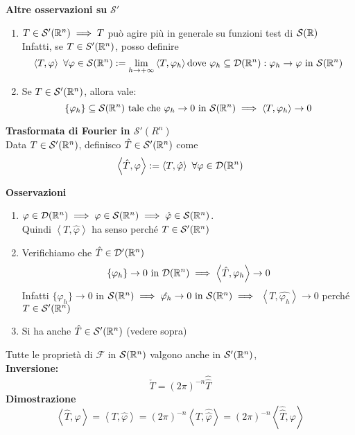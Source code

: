 \textbf{Altre osservazioni su }$\mathcal S'$ 
\begin{enumerate}
	\item $T\in \mathcal S'(\mathbb{R}^n)\implies T$ può agire più in generale su funzioni test di $\mathcal S(\mathbb{R})$
		\\Infatti, se $T\in S'(\mathbb{R}^n)$, posso definire 
		\[\left< T,\varphi \right> \ \forall \varphi \in \mathcal S(\R^n):=\lim_{h \to +\infty} \left< T,\varphi_h \right> \text{dove }\varphi_h \subseteq  \mathcal D(\R^n):\varphi_h\to \varphi\text{ in }\mathcal S(\R^n)\]
	\item Se $T\in \mathcal S '(\mathbb{R}^n)$, allora vale:
		\[\{\varphi_h\} \subseteq  \mathcal S(\mathbb{R}^n)\text{ tale che }\varphi_h\to 0\text{ in }\mathcal S( \mathbb{R}^n)\implies \left< T,\varphi_h \right> \to 0\]

\end{enumerate}
\begin{tcolorbox}
	\textbf{Trasformata di Fourier in $\mathcal S'(R^n)$}
	\\Data $T \in \mathcal S'(\mathbb{R}^n)$, definisco $\hat{T}\in \mathcal S'(\mathbb{R}^n)$ come
	\[\left< \hat{T}, \varphi \right> :=\left< T,\hat{\varphi} \right> \ \forall \varphi \in  \mathcal D(\mathbb{R}^n)\]

\end{tcolorbox}
\textbf{Osservazioni} 
\begin{enumerate}
	\item $\varphi \in \mathcal D(\mathbb{R}^n)\implies \varphi \in \mathcal S(\mathbb{R}^n)\implies \hat{\varphi}\in \mathcal S(\mathbb{R}^n)$. \\Quindi $\left< T, \hat{\varphi} \right> $ ha senso perché $T\in \mathcal S'(\mathbb{R}^n)$ 
	\item Verifichiamo che $\hat{T} \in \mathcal D'(\mathbb{R}^n)$ 
	\[\{\varphi_h\}\to 0\text{ in }\mathcal D(\mathbb{R}^n)\implies \left< \hat{T}, \varphi_h \right> \to 0 \]
		Infatti $\{\varphi_h\} \to 0$ in $\mathcal S(\mathbb{R}^n)\implies \hat{\varphi_h}\to 0\text{ in }\mathcal S(\mathbb{R}^n)\implies $ $\left< T,\hat{\varphi_h} \right> \to 0$ perché $T\in \mathcal S'(\mathbb{R}^n)$ 
	\item Si ha anche $\hat{ T}\in \mathcal S'(\mathbb{R}^n)$ (vedere sopra)
\end{enumerate}
Tutte le proprietà di $\mathcal F$ in $\mathcal S(\mathbb{R}^n)$ valgono anche in $\mathcal S'(\mathbb{R}^n)$,  
\\\textbf{Inversione:}
\[\check{T}=(2\pi)^{-n}\hat{\hat{T}}\]
\textbf{Dimostrazione}
\[\left< \hat{T},\varphi \right> =\left< T,\hat{\varphi} \right> =(2\pi)^{-n}\left< T,\hat{\hat{\varphi }}\right> = (2\pi)^{-n} \left< \hat{\hat{T}},\varphi \right> \]
